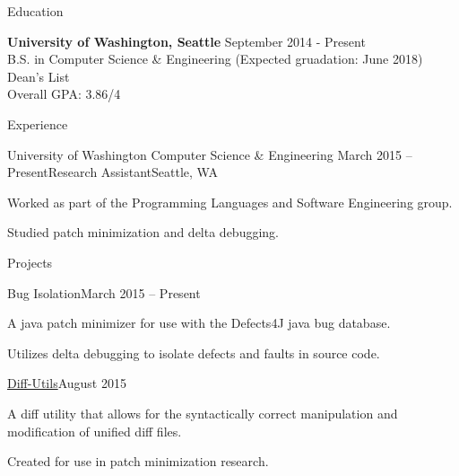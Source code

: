 \documentclass{resume} %
\begin{document}

\begin{rSection}{Education}

  {\bf University of Washington, Seattle} \hfill {September 2014 - Present} \\
  B.S. in Computer Science \& Engineering (Expected gruadation: June 2018) \\
  Dean's List \\
  Overall GPA: 3.86/4

\end{rSection}


\begin{rSection}{Experience}

  \begin{rSubsection}{University of Washington Computer Science \& Engineering}
    {March 2015 -- Present}{Research Assistant}{Seattle, WA}
  \item Worked as part of the Programming Languages and Software Engineering
    group.
  \item Studied patch minimization and delta debugging.
  \end{rSubsection}

\end{rSection}


\begin{rSection}{Projects}

\begin{rSubsection}{Bug Isolation}{March 2015 -- Present}{}{}
\item A java patch minimizer for use with the Defects4J java bug database.
\item Utilizes delta debugging to isolate defects and faults in source code.
\end{rSubsection}

\begin{rSubsection}{\href{https://github.com/dericp/diff-utils}{Diff-Utils}}{August 2015}{}{}
\item A diff utility that allows for the syntactically correct manipulation and
  modification of unified diff files.
\item Created for use in patch minimization research.
\end{rSubsection}

\end{rSection}
\end{document}
